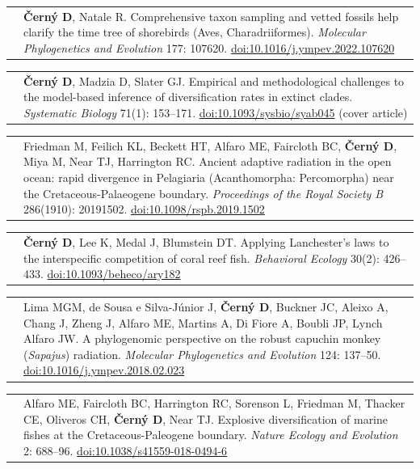\documentclass[10pt]{article}
\begin{document}
\noindent \begin{tabularx}{\textwidth}{>{\raggedleft\arraybackslash}p{2.2cm} X}
2022 & \textbf{\v{C}ern\'{y} D}, Natale R. Comprehensive taxon sampling and vetted fossils help clarify the time tree of shorebirds (Aves, Charadriiformes). \textit{Molecular Phylogenetics and Evolution} 177: 107620. \href{http://doi.org/10.1016/j.ympev.2022.107620}{doi:10.1016/j.ympev.2022.107620}
\end{tabularx}
\begin{tabularx}{\textwidth}{>{\raggedleft\arraybackslash}p{2.2cm} p{10.5cm}}
2021 & \textbf{\v{C}ern\'{y} D}, Madzia D, Slater GJ. Empirical and methodological challenges to the model-based inference of diversification rates in extinct clades. \textit{Systematic Biology} 71(1): 153--171. \href{http://doi.org/10.1093/sysbio/syab045}{doi:10.1093/sysbio/syab045} (cover article)
\end{tabularx}
\begin{tabularx}{\textwidth}{>{\raggedleft\arraybackslash}p{2.2cm} p{10.5cm}}
2019 & Friedman M, Feilich KL, Beckett HT, Alfaro ME, Faircloth BC, \textbf{\v{C}ern\'{y} D}, Miya M, Near TJ, Harrington RC. Ancient adaptive radiation in the open ocean: rapid divergence in Pelagiaria (Acanthomorpha: Percomorpha) near the Cretaceous-Palaeogene boundary. \textit{Proceedings of the Royal Society B} 286(1910): 20191502. \href{http://doi.org/10.1098/rspb.2019.1502}{doi:10.1098/rspb.2019.1502}
\end{tabularx}
\begin{tabularx}{\textwidth}{>{\raggedleft\arraybackslash}p{2.2cm} X}
2018 & \textbf{\v{C}ern\'{y} D}, Lee K, Medal J, Blumstein DT. Applying Lanchester's laws to the interspecific competition of coral reef fish. \textit{Behavioral Ecology} 30(2): 426--433. \href{http://doi.org/10.1093/beheco/ary182}{doi:10.1093/beheco/ary182}
\end{tabularx}
\begin{tabularx}{\textwidth}{>{\raggedleft\arraybackslash}p{2.2cm} X}
2018 & Lima MGM, de Sousa e Silva-J\'{u}nior J, \textbf{\v{C}ern\'{y} D}, Buckner JC, Aleixo A, Chang J, Zheng J, Alfaro ME, Martins A, Di Fiore A, Boubli JP, Lynch Alfaro JW. A phylogenomic perspective on the robust capuchin monkey (\textit{Sapajus}) radiation. \textit{Molecular Phylogenetics and Evolution} 124: 137--50. \href{http://doi.org/10.1016/j.ympev.2018.02.023}{doi:10.1016/j.ympev.2018.02.023}
\end{tabularx}
\begin{tabularx}{\textwidth}{>{\raggedleft\arraybackslash}p{2.2cm} X}
2018 & Alfaro ME, Faircloth BC, Harrington RC, Sorenson L, Friedman M, Thacker CE, Oliveros CH, \textbf{\v{C}ern\'{y} D}, Near TJ. Explosive diversification of marine fishes at the Cretaceous-Paleogene boundary. \textit{Nature Ecology and Evolution} 2: 688--96. \href{http://doi.org/10.1038/s41559-018-0494-6}{doi:10.1038/s41559-018-0494-6}
\end{tabularx}
\end{document}

